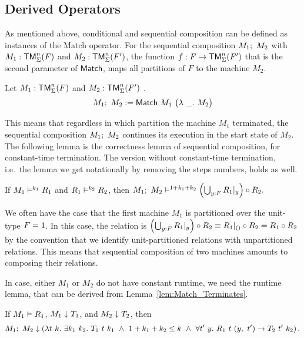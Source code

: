 \subsection{Derived Operators}
\label{sec:match-derived-operators}

As mentioned above, conditional and sequential composition can be defined as instances of the Match operator.  For the sequential composition
$M_1 ;~ M_2$ with $M_1 : \mathsf{TM}_\Sigma^n(F)$ and $M_2 : \mathsf{TM}_\Sigma^n(F')$, the function $f : F \rightarrow \mathsf{TM}_\Sigma^n(F')$ that is the second parameter of
$\mathsf{Match}$, maps all partitions of $F$ to the machine $M_2$.
\begin{definition}
  \label{def:Seq}
  Let $M_1 : \mathsf{TM}_\Sigma^n(F)$ and $M_2 : \mathsf{TM}_\Sigma^n(F')$ .
  \[
    M_1 ;~ M_2 := \mathsf{Match}~M_1~
    \bigl(
    \lambda~\_.~M_2
    \bigr)
  \]
\end{definition}
This means that regardless in which partition the machine $M_1$ terminated, the sequential composition $M_1 ;~ M_2$ continues its execution in the
start state of $M_2$.  The following lemma is the correctness lemma of sequential composition, for constant-time termination.  The version without
constant-time termination, i.e.\ the lemma we get notationally by removing the steps numbers, holds as well.

\begin{lemma}
  \label{lem:Seq_RealiseIn}
  If $M_1 \mathrel{\vDash^{k_1}} R_1$ and $R_1 \mathrel{\vDash^{k_2}} R_2$, then
  $
  M_1 ;~ M_2 \mathrel{\vDash^{1+k_1+k_2}} \left(\bigcup_{y:F} R_1{|}_{y}\right) \circ R_2.
  $
\end{lemma}

We often have the case that the first machine $M_1$ is partitioned over the unit-type $F = \mathsf{1}$.  In this case, the relation is
$\left(\bigcup_{y:F} R_1{|}_{y}\right) \circ R_2 \equiv R_1 {|}_{\mathsf{()}} \circ R_2 = R_1 \circ R_2$ by the convention that we identify unit-partitioned
relations with unpartitioned relations.  This means that sequential composition of two machines amounts to composing their relations.

In case, either $M_1$ or $M_2$ do not have constant runtime, we need the runtime lemma, that can be derived from Lemma~\ref{lem:Match_Terminates}.
\begin{lemma}
  \label{lem:Seq_TerminatesIn}
  If $M_1 \mathrel{\vDash} R_1$, $M_1 \mathrel{\downarrow} T_1$, and $M_2 \mathrel{\downarrow} T_2$, then
  \[
    M_1 \Seq M_2 \TerminatesIn
    \left(%
      \lambda t~k.~\exists k_1~k_2.~T_1~t~k_1 ~\land~ 1 + k_1 + k_2 \leq k ~\land~ \forall t'~y.~R_1~t~(y,~t') \rightarrow T_2~t'~k_2 %
    \right).
  \]
\end{lemma}


